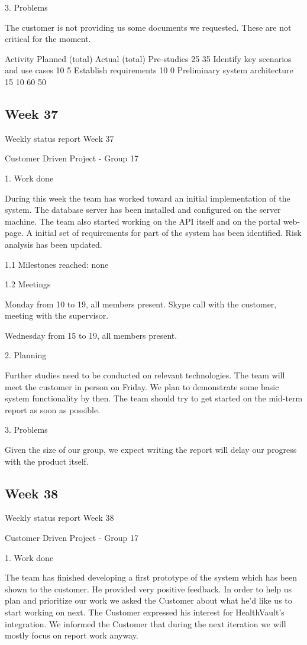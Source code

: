 3. Problems

The customer is not providing us some documents we requested.
These are not critical for the moment.

Activity
Planned (total)
Actual (total)
Pre-studies
25
35
Identify key scenarios and use cases
10
5
Establish requirements
10
0
Preliminary system architecture
15
10
60
50

\subsection{Week 37}
Weekly status report
Week 37

Customer Driven Project - Group 17


1. Work done

During this week the team has worked toward an initial implementation of the system. The database server has been installed and configured on the server machine. The team also started working on the API itself and on the portal web-page. A initial set of requirements for part of the system has been identified. Risk analysis has been updated.

1.1 Milestones reached: none

1.2 Meetings

Monday
from 10 to 19, all members present.
Skype call with the customer, meeting with the supervisor.

Wednesday
from 15 to 19, all members present.

2. Planning

Further studies need to be conducted on relevant technologies. The team will meet the customer in person on Friday. We plan to demonstrate some basic system functionality by then. The team should try to get started on the mid-term report as soon as possible.



3. Problems

Given the size of our group, we expect writing the report will delay our progress with the product itself.


\subsection{Week 38}
Weekly status report
Week 38

Customer Driven Project - Group 17


1. Work done

The team has finished developing a first prototype of the system which has been shown to the customer. He provided very positive feedback.
In order to help us plan and prioritize our work we asked the Customer about what he’d like us to start working on next. The Customer expressed his interest for HealthVault's integration. We informed the Customer that during the next iteration we will mostly focus on report work anyway.

